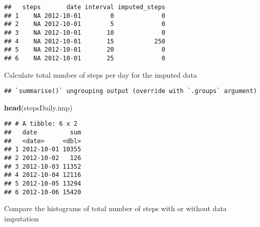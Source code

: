 \documentclass[]{article}
\newenvironment{Shaded}{\begin{snugshade}}{\end{snugshade}}
\newcommand{\DataTypeTok}[1]{\textcolor[rgb]{0.13,0.29,0.53}{#1}}
\newcommand{\KeywordTok}[1]{\textcolor[rgb]{0.13,0.29,0.53}{\textbf{#1}}}
\newcommand{\NormalTok}[1]{#1}
\newcommand{\OperatorTok}[1]{\textcolor[rgb]{0.81,0.36,0.00}{\textbf{#1}}}
\newcommand{\StringTok}[1]{\textcolor[rgb]{0.31,0.60,0.02}{#1}}
\begin{document}
\begin{verbatim}
##   steps       date interval imputed_steps
## 1    NA 2012-10-01        0             0
## 2    NA 2012-10-01        5             0
## 3    NA 2012-10-01       10             0
## 4    NA 2012-10-01       15           250
## 5    NA 2012-10-01       20             0
## 6    NA 2012-10-01       25             0
\end{verbatim}

Calculate total number of steps per day for the imputed data

\begin{Shaded}
\end{Shaded}

\begin{verbatim}
## `summarise()` ungrouping output (override with `.groups` argument)
\end{verbatim}

\begin{Shaded}
\begin{Highlighting}[]
\KeywordTok{head}\NormalTok{(stepsDaily.imp)}
\end{Highlighting}
\end{Shaded}

\begin{verbatim}
## # A tibble: 6 x 2
##   date         sum
##   <date>     <dbl>
## 1 2012-10-01 10355
## 2 2012-10-02   126
## 3 2012-10-03 11352
## 4 2012-10-04 12116
## 5 2012-10-05 13294
## 6 2012-10-06 15420
\end{verbatim}

Compare the histograms of total number of steps with or without data
imputation
\end{document}
